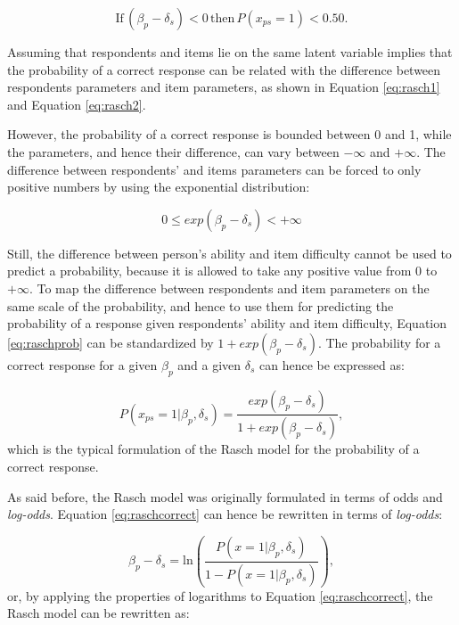 \documentclass[12pt]{book}
\begin{document}
\begin{equation}\label{eq:rasch2}
	\text{If} \, (\beta_p - \delta_s) < 0 \, \text{then} \, P(x_{ps} = 1) < 0.50.
\end{equation}

Assuming that respondents and items lie on the same latent variable implies that the probability of a correct response can be related with the difference between respondents parameters and item parameters, as shown in Equation \ref{eq:rasch1} and Equation \ref{eq:rasch2}. 

However, the probability of a correct response is bounded between 0 and 1, while the parameters, and hence their difference, can vary between $- \infty$ and $+ \infty$. 
The difference between respondents' and items parameters can be forced to only positive numbers by using the exponential distribution: 

\begin{equation}\label{eq:raschprob}
	0 \leq exp(\beta_p - \delta_s) < + \infty
\end{equation}

Still, the difference between person's ability and item difficulty cannot be used to predict a probability, because it is allowed to take any positive value from 0 to $+ \infty$. 
To map the difference between respondents and item parameters on the same scale of the probability, and hence to use them for predicting the probability of a response given respondents' ability and item difficulty, Equation \ref{eq:raschprob} can be standardized by $1 + exp(\beta_p - \delta_s)$. 
The probability for a correct response for a given $\beta_p$ and a given $\delta_s$ can hence be expressed as: 

\begin{equation}\label{eq:raschcorrect}
	P(x_{ps} = 1 | \beta_p, \delta_s) = \frac{exp(\beta_p - \delta_s)}{1 + exp(\beta_p - \delta_s)},
\end{equation}
which is the typical formulation of the Rasch model for the probability of a correct response. 

As said before, the Rasch model was originally formulated in terms of odds and \emph{log-odds}. Equation \ref{eq:raschcorrect} can hence be rewritten in terms of \emph{log-odds}:

\begin{equation}\label{eq:raschcorrectlog}
	\beta_p - \delta_s = \text{ln}\left(\frac{P(x =1|\beta_p, \delta_s)}{1 - P(x =1|\beta_p, \delta_s)}\right),
\end{equation} 
or, by applying the properties of logarithms to Equation \ref{eq:raschcorrect}, the Rasch model can be rewritten as: 
\end{document}

